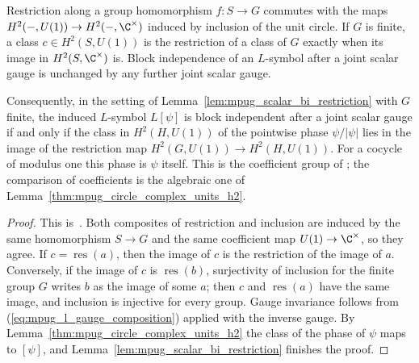 \begin{lemma}
    \label{lem:mpug_scalar_bi_restriction_circle}
    \leanok
    Restriction along a group homomorphism $f\colon S\to G$ commutes with
    the maps $H^2(-,U(1))\to H^2(-,\C^\times)$ induced by inclusion of the
    unit circle. If $G$ is finite, a class $c\in H^2(S,U(1))$ is the
    restriction of a class of $G$ exactly when its image in
    $H^2(S,\C^\times)$ is. Block independence of an $L$-symbol after
    a joint scalar gauge is unchanged by any further joint scalar gauge.

    Consequently, in the setting of Lemma~\ref{lem:mpug_scalar_bi_restriction}
    with $G$ finite, the induced $L$-symbol $L[\psi]$ is block independent
    after a joint scalar gauge if and only if the class in $H^2(H,U(1))$ of
    the pointwise phase $\psi/|\psi|$ lies in the image of the restriction map
    $H^2(G,U(1))\to H^2(H,U(1))$. For a cocycle of modulus one this phase is
    $\psi$ itself. This is the coefficient group of
    \cite[lines~7042--7064]{FrancoRubio2025MPUGauging}; the comparison of
    coefficients is the algebraic one of
    Lemma~\ref{thm:mpug_circle_complex_units_h2}.
\end{lemma}

\begin{proof}\leanok
    This is~\cite[``Scalar block independence with circle
        coefficients'']{QICLean2026Blueprint}.
    Both composites of restriction and inclusion are induced by the same
    homomorphism $S\to G$ and the same coefficient map
    $U(1)\to\C^\times$, so they agree. If $c=\operatorname{res}(a)$, then
    the image of $c$ is the restriction of the image of $a$. Conversely, if
    the image of $c$ is $\operatorname{res}(b)$, surjectivity of inclusion
    for the finite group $G$ writes $b$ as the image of some $a$; then $c$
    and $\operatorname{res}(a)$ have the same image, and inclusion is
    injective for every group. Gauge invariance follows from
    (\ref{eq:mpug_l_gauge_composition}) applied with the inverse gauge. By
    Lemma~\ref{thm:mpug_circle_complex_units_h2} the class of the phase of
    $\psi$ maps to $[\psi]$, and Lemma~\ref{lem:mpug_scalar_bi_restriction}
    finishes the proof.
\end{proof}

